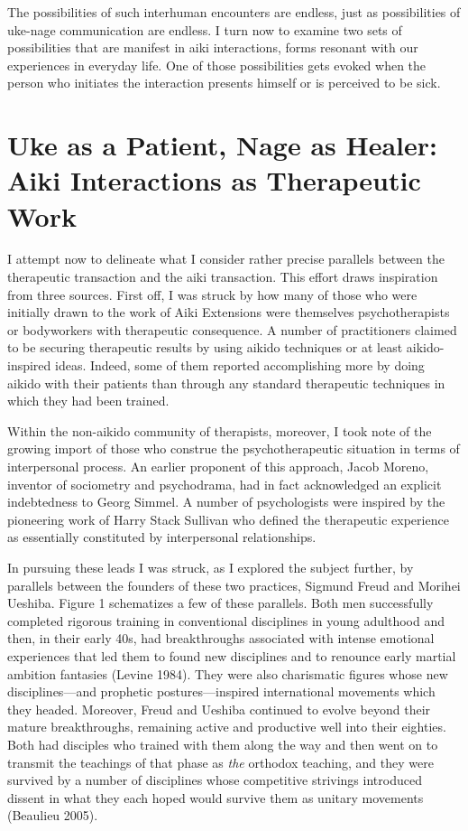 The possibilities of such interhuman encounters are endless, just as possibilities of uke-nage communication are endless. I turn now to examine two sets of possibilities that are manifest in aiki interactions, forms resonant with our experiences in everyday life. One of those possibilities gets evoked when the person who initiates the interaction presents himself or is perceived to be sick. 

\section*{Uke as a Patient, Nage as Healer: Aiki Interactions as Therapeutic Work}

I attempt now to delineate what I consider rather precise parallels between the therapeutic transaction and the aiki transaction. This effort draws inspiration from three sources. First off, I was struck by how many of those who were initially drawn to the work of Aiki Extensions were themselves psychotherapists or bodyworkers with therapeutic consequence. A number of practitioners claimed to be securing therapeutic results by using aikido techniques or at least aikido-inspired ideas. Indeed, some of them reported accomplishing more by doing aikido with their patients than through any standard therapeutic techniques in which they had been trained. 

Within the non-aikido community of therapists, moreover, I took note of the growing import of those who construe the psychotherapeutic situation in terms of interpersonal process. An earlier proponent of this approach, Jacob Moreno, inventor of sociometry and psychodrama, had in fact acknowledged an explicit indebtedness to Georg Simmel. A number of psychologists were inspired by the pioneering work of Harry Stack Sullivan who defined the therapeutic experience as essentially constituted by interpersonal relationships. 

In pursuing these leads I was struck, as I explored the subject further, by parallels between the founders of these two practices, Sigmund Freud and Morihei Ueshiba. Figure 1 schematizes a few of these parallels. Both men successfully completed rigorous training in conventional disciplines in young adulthood and then, in their early 40s, had breakthroughs associated with intense emotional experiences that led them to found new disciplines and to renounce early martial ambition fantasies (Levine 1984). They were also charismatic figures whose new disciplines---and prophetic postures---inspired international movements which they headed. Moreover, Freud and Ueshiba continued to evolve beyond their mature breakthroughs, remaining active and productive well into their eighties. Both had disciples who trained with them along the way and then went on to transmit the teachings of that phase as \emph{the} orthodox teaching, and they were survived by a number of disciplines whose competitive strivings introduced dissent in what they each hoped would survive them as unitary movements (Beaulieu 2005).

